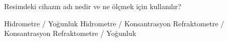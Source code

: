 \begin{question}[subtitle=]
  	\begin{figure}[!htb]
		\centering
	\end{figure}

Resimdeki cihazın adı nedir ve ne ölçmek için kullanılır?
	\begin{tasks}
          \task Hidrometre / Yoğunluk \correct
          \task Hidrometre / Konsantrasyon
          \task Refraktometre / Konsantrasyon
          \task Refraktometre / Yoğunluk
	\end{tasks}
\end{question}
\begin{solution}
	\correct
\end{solution}

